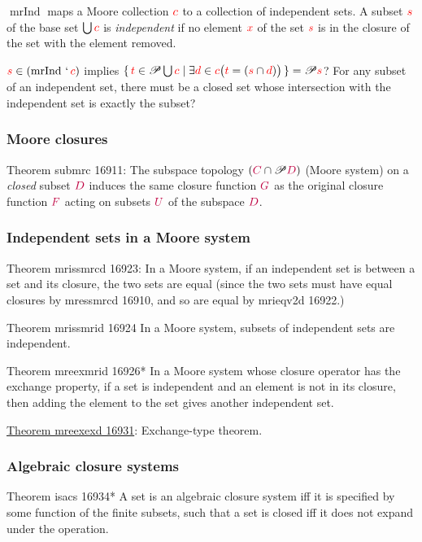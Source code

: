 \documentclass[12pt, letterpaper]{article}
\newcommand{\union}[2][]{
	\ifthenelse { \equal {#1} {} }
		{ \bigcup{#2} } %
		{ {#1}\cup{#2} } %
}
\newcommand{\inters}[2][]{
	\ifthenelse { \equal {#1} {} }
	{ \bigcap{#2} } %
	{ {#1}\cap{#2} } %
}
\newcommand{\mrInd}{\operatorname{mrInd}}
\newcommand{\red}[1]{{\color{red} #1}}
\newcommand{\purple}[1]{{\color{purple} #1}}
\newcommand{\setvar}{\red}
\newcommand{\classvar}{\purple}
\newcommand{\sx}{\setvar{x}}
\newcommand{\clC}{\classvar{C}}
\newcommand{\clD}{\classvar{D}}
\newcommand{\clF}{\classvar{F}}
\newcommand{\clG}{\classvar{G}}
\newcommand{\clU}{\classvar{U}}
\newcommand{\at}{\,`\,}
\newcommand{\power}{\mathscr{P}}
\theoremstyle{definition}
\theoremstyle{remark}
\theoremstyle{definition}
\theoremstyle{plain}
\begin{document}
	$\mrInd$ maps a Moore collection $\setvar{c}$ to a collection of independent sets. A subset $\setvar{s}$ of the base set $\union{\setvar{c}}$ is \textit{independent} if no element $\sx$ of the set $\setvar{s}$ is in the closure of the set with the element removed.
	
	$\setvar{s}\in(\mrInd\at\setvar{c})$
	implies
	$\set{\setvar{t}\in\power\union{\setvar{c}}|\exists\setvar{d}\in\setvar{c}\big(\setvar{t}=(\inters[\setvar{s}]{\setvar{d}})\big)}=\power\setvar{s}$?
	For any subset of an independent set, there must be a closed set whose intersection with the independent set is exactly the subset?
	
	\subsubsection{Moore closures}
	
	Theorem	submrc 16911: The subspace topology $(\inters[\clC]{\power\clD})$ (Moore system) on a \textit{closed} subset $\clD$ induces the same closure function $\clG$ as the original closure function $\clF$ acting on subsets $\clU$ of the subspace $\clD$.
	
	\subsubsection{Independent sets in a Moore system}
	
	Theorem	mrissmrcd 16923:	In a Moore system, if an independent set is between a set and its closure, the two sets are equal (since the two sets must have equal closures by mressmrcd 16910, and so are equal by mrieqv2d 16922.)
	
	Theorem	mrissmrid 16924	In a Moore system, subsets of independent sets are independent.
	
	Theorem	mreexmrid 16926*	In a Moore system whose closure operator has the exchange property, if a set is independent and an element is not in its closure, then adding the element to the set gives another independent set.
	
	\href{https://us.metamath.org/mpeuni/mreexexd.html}{Theorem mreexexd 16931}: Exchange-type theorem.
		
	\subsubsection{Algebraic closure systems}
	
	Theorem	isacs 16934*	A set is an algebraic closure system iff it is specified by some function of the finite subsets, such that a set is closed iff it does not expand under the operation.
	
\end{document}
